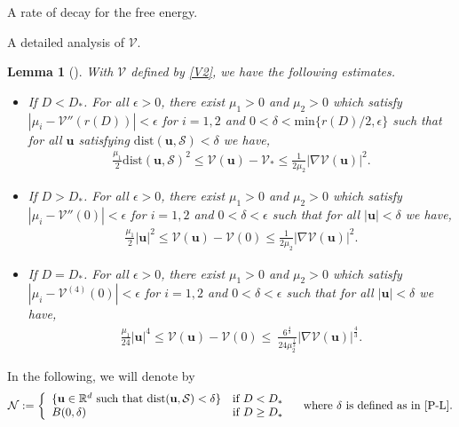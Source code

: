 \documentclass[reqno]{amsart} %
\newtheorem{lemma}{Lemma}[section]
\begin{document}
\begin{section}{A rate of decay for the free energy.}
\begin{subsection}{A detailed analysis of  \texorpdfstring{$\mathcal{V}$}{V}.}
\begin{lemma}[]
\label{P-L}
With $\mathcal{V}$ defined by \eqref{V2}, we have the following estimates.
\leavevmode\\
\begin{itemize}
    \item If \( D < D_* \). For all $\epsilon >0$,  there exist $\mu_1>0$ and $\mu_2>0$ which satisfy $|\mu_i-\mathcal{V}''(r(D))|<\epsilon$ for $i=1,2$ and $0<\delta< \mathrm{min}\big\{r(D)/2, \epsilon\big \}$ such that for all $\mathbf{u}$ satisfying $\mathrm{dist}(\mathbf{u},\mathcal{S})<\delta $ we have,
    \begin{align}\label{P_L_M_B}
        \frac{\mu_1}{2} \mathrm{dist}(\mathbf{u},\mathcal{S})^2 
        \leq \mathcal{V}(\mathbf{u}) - \mathcal{V}_* 
        \leq \frac{1}{2\mu_2} |\nabla \mathcal{V}(\mathbf{u})|^2 .
    \end{align}
    \item If \( D > D_* \). For all $\epsilon >0$,  there exist $\mu_1>0$ and $\mu_2>0$ which satisfy $|\mu_i-\mathcal{V}''(0)|<\epsilon$ for $i=1,2$ and $0<\delta<\epsilon$ such that for all $|\mathbf{u}|<\delta$ we have,
    \begin{align}
    \label{Pol_D>D_*}
    \frac{\mu_1}{2} |\mathbf{u}|^2\leq \mathcal{V}(\mathbf{u})-\mathcal{V}(0)\leq \frac{1}{2\mu_2}|\nabla\mathcal{V}(\mathbf{u})|^{2} .
\end{align}
\item If \( D = D_* \). For all $\epsilon >0$,  there exist $\mu_1>0$ and $\mu_2>0$ which satisfy $|\mu_i-\mathcal{V}^{(4)}(0)|<\epsilon$ for $i=1,2$ and  $0<\delta<\epsilon$ such that for all $|\mathbf{u}|<\delta$ we have,
\begin{align}
\label{polD=D_*}
    \frac{\mu_1}{24} |\mathbf{u}|^4\leq \mathcal{V}(\mathbf{u})-\mathcal{V}(0)\leq \ \frac{6^{\frac{4}{3}}}{24 \mu_2^{\frac{1}{3}}} |\nabla\mathcal{V}(\mathbf{u})|^{\frac{4}{3}}.
\end{align}
\end{itemize}
\end{lemma}
In the following, we will denote by 
\begin{equation}
\label{N}
\mathcal{N}:=
\left\{
\begin{array}{ll}
\{\mathbf{u} \in \mathbb{R}^d \text{ such that } \mathrm{dist}(\mathbf{u},\mathcal{S}) < \delta\} & \text{if } D < D_* \\
B(0,\delta) & \text{if } D \geq D_*
\end{array} 
\right.
\quad \text{where } \delta \text{ is defined as in \Cref{P-L}.}
\end{equation}


\end{subsection}
\end{section}
\end{document}
